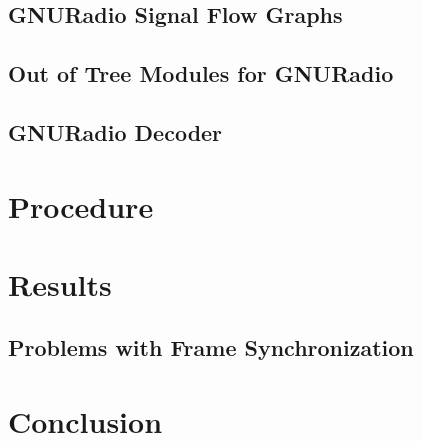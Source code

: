 \documentclass[conference]{IEEEtran}
\begin{document}
\subsection{GNURadio Signal Flow Graphs}

\subsection{Out of Tree Modules for GNURadio}

\subsection{GNURadio Decoder}

\section{Procedure}

\section{Results}

\subsection{Problems with Frame Synchronization}

\section{Conclusion}







\end{document}
